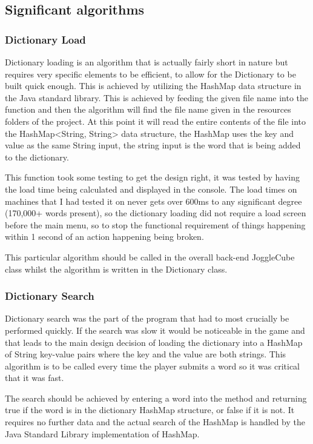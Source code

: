 \subsection{Significant algorithms} %
    \subsubsection{Dictionary Load}
    Dictionary loading is an algorithm that is actually fairly short in nature but requires very specific elements to be efficient, to allow for the Dictionary to be built quick enough. This is achieved by utilizing the HashMap data structure in the Java standard library. This is achieved by feeding the given file name into the function and then the algorithm will find the file name given in the resources folders of the project. At this point it will read the entire contents of the file into the HashMap<String, String> data structure, the HashMap uses the key and value as the same String input, the string input is the word that is being added to the dictionary.
    
    This function took some testing to get the design right, it was tested by having the load time being calculated and displayed in the console. The load times on machines that I had tested it on never gets over 600ms to any significant degree (170,000+ words present), so the dictionary loading did not require a load screen before the main menu, so to stop the functional requirement of things happening within 1 second of an action happening being broken.
    
    This particular algorithm should be called in the overall back-end JoggleCube class whilst the algorithm is written in the Dictionary class.
    \subsubsection{Dictionary Search}
    Dictionary search was the part of the program that had to most crucially be performed quickly. If the search was slow it would be noticeable in the game and that leads to the main design decision of loading the dictionary into a HashMap of String key-value pairs where the key and the value are both strings. This algorithm is to be called every time the player submits a word so it was critical that it was fast.
    
    The search should be achieved by entering a word into the method and returning true if the word is in the dictionary HashMap structure, or false if it is not. It requires no further data and the actual search of the HashMap is handled by the Java Standard Library implementation of HashMap.
    
